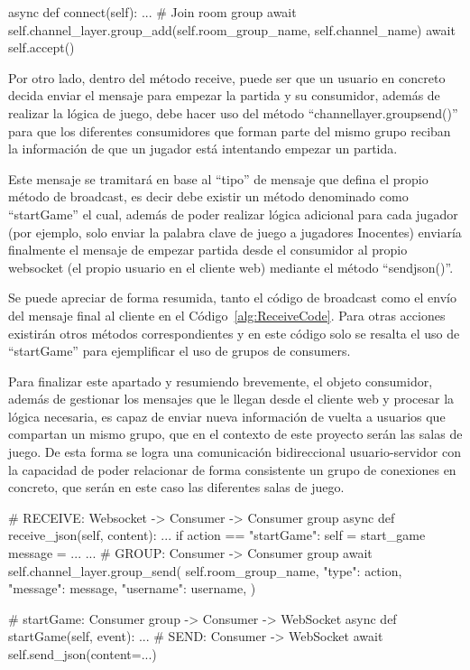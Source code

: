 \begin{mypython}[float={h},caption={Añadir consumer a un grupo},label={alg:JoinGroup}]
	async def connect(self):
		...
		# Join room group
		await self.channel_layer.group_add(self.room_group_name, self.channel_name)
		await self.accept()
									
\end{mypython}

Por otro lado, dentro del método receive, puede ser que un usuario en concreto decida enviar el mensaje para empezar la partida y su consumidor, además de realizar la lógica de juego, 
debe hacer uso del método ``channel\textunderscore layer.group\textunderscore send()'' para que los diferentes consumidores que forman parte del mismo grupo reciban la 
información de que un jugador está intentando empezar un partida. 

Este mensaje se tramitará en base al ``tipo'' de mensaje que defina el propio método de broadcast, es decir debe
existir un método denominado como ``startGame'' el cual, además de poder realizar lógica adicional para cada jugador (por ejemplo, solo enviar la palabra clave de juego a jugadores Inocentes) 
enviaría finalmente el mensaje de empezar partida desde el consumidor al propio websocket (el propio usuario en el cliente web) mediante el método ``send\textunderscore json()''. 

Se puede apreciar de forma resumida, tanto el código de broadcast como el envío del mensaje final al cliente en el Código~\ref{alg:ReceiveCode}. Para otras acciones existirán
otros métodos correspondientes y en este código solo se resalta el uso de ``startGame'' para ejemplificar el uso de grupos de consumers.

Para finalizar este apartado y resumiendo brevemente, el objeto consumidor, además de gestionar los mensajes que le llegan desde el cliente web y procesar la lógica necesaria, 
es capaz de enviar nueva información de vuelta a usuarios que compartan un mismo grupo, que en el contexto de este proyecto serán las salas de juego. De esta forma se logra
una comunicación bidireccional usuario-servidor con la capacidad de poder relacionar de forma consistente un grupo de conexiones en concreto, que serán en este caso las diferentes salas
de juego.

\begin{mypython}[float={h},caption={Broadcast a todos los consumidores y envío final al cliente},label={alg:ReceiveCode}]
						
	# RECEIVE: Websocket -> Consumer -> Consumer group
	async def receive_json(self, content):
		...	
		if action == "startGame":
		self = start_game
		message = {...}
		...	
		# GROUP: Consumer -> Consumer group
		await self.channel_layer.group_send(
		self.room_group_name,
		{"type": action, "message": message, "username": username},
		)
					
	# startGame: Consumer group -> Consumer -> WebSocket
	async def startGame(self, event):
		...
		# SEND: Consumer -> WebSocket
		await self.send_json(content={...})
									
\end{mypython}

